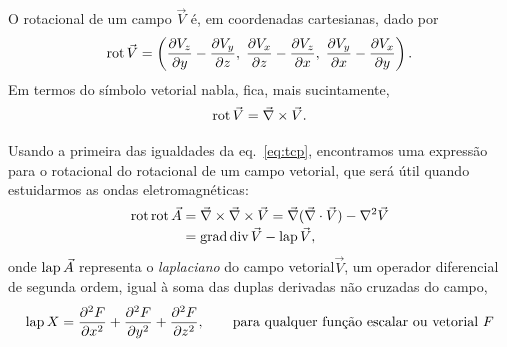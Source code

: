 O rotacional de um campo $\vec V$ é, em coordenadas cartesianas, dado por
\begin{equation}\label{eq:rotcart}
  \rot\vec V=
  \left(\pd{V_z}{y}-\pd{V_y}{z},\; \pd{V_x}{z}-\pd{V_z}{x},\;
  \pd{V_y}{x}-\pd{V_x}{y}\right).
\end{equation}
Em termos do símbolo vetorial nabla, fica, mais sucintamente,
\begin{equation}
  \rot\vec V=\vec\nabla\times\vec V.
\end{equation}

Usando a primeira das igualdades da eq.~\eqref{eq:tcp}, encontramos uma
expressão para o rotacional do rotacional de um campo vetorial, que será útil
quando estuidarmos as ondas eletromagnéticas:
\begin{align}
\rot\rot \vec A&=\vec\nabla\times\vec\nabla\times\vec V=
\vec \nabla(\vec\nabla\cdot\vec V)-\nabla^2\vec V\nonumber\\
&=\grad\div \vec V-\lap\vec V,
\end{align}
onde $\lap\vec A$ representa o \emph{laplaciano} do campo vetorial$\vec V$, um
operador diferencial de segunda ordem, igual à soma das duplas derivadas não
cruzadas do campo,
\begin{equation}
\text{lap}\, X =
\frac{\partial^2 F}{\partial x^2}+
\frac{\partial^2 F}{\partial y^2}+
\frac{\partial^2 F}{\partial z^2},\qquad\text{para qualquer função escalar ou vetorial $F$}
\end{equation}
